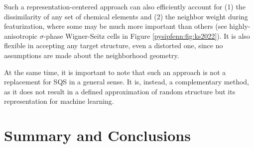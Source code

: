 Such a representation-centered approach can also efficiently account for (1) the dissimilarity of any set of chemical elements and (2) the neighbor weight during featurization, where some may be much more important than others (see highly-anisotropic $\sigma$-phase Wigner-Seitz cells in Figure \ref{pysipfenn:fig:ks2022}). It is also flexible in accepting any target structure, even a distorted one, since no assumptions are made about the neighborhood geometry.

At the same time, it is important to note that such an approach is not a replacement for SQS in a general sense. It is, instead, a complementary method, as it does not result in a defined approximation of random structure but its representation for machine learning.

\section{Summary and Conclusions} \label{pysipfenn:sec:summaryconclusions}

